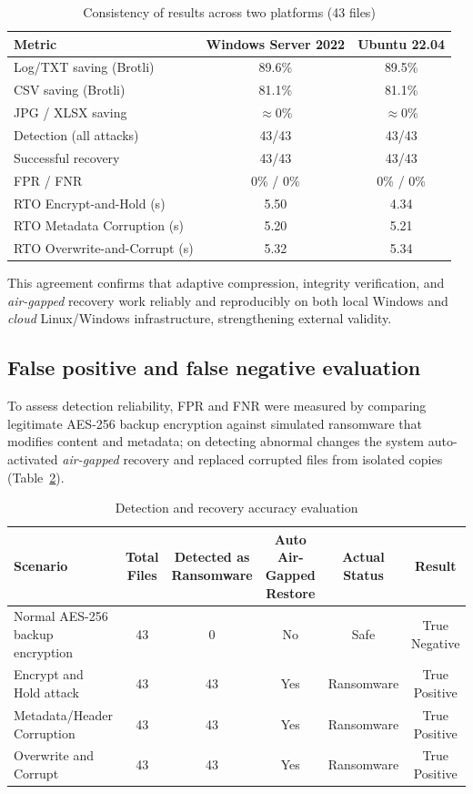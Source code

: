 \documentclass{iaesarticle}
\begin{document}
\begin{table}[H]
\centering
\fontsize{8pt}{10pt}\selectfont
\caption{Consistency of results across two platforms (43 files)}
\label{tab:cross_platform}
\begin{tabular}{l c c}
\hline
\textbf{Metric} & \textbf{Windows Server 2022} & \textbf{Ubuntu 22.04} \\
\hline
Log/TXT saving (Brotli) & 89.6\% & 89.5\% \\
CSV saving (Brotli)     & 81.1\% & 81.1\% \\
JPG / XLSX saving       & $\approx$0\% & $\approx$0\% \\
Detection (all attacks) & 43/43 & 43/43 \\
Successful recovery     & 43/43 & 43/43 \\
FPR / FNR               & 0\% / 0\% & 0\% / 0\% \\
RTO Encrypt-and-Hold (s) & 5.50 & 4.34 \\
RTO Metadata Corruption (s) & 5.20 & 5.21 \\
RTO Overwrite-and-Corrupt (s) & 5.32 & 5.34 \\
\hline
\end{tabular}
\end{table}

This agreement confirms that adaptive compression, integrity verification, and \textit{air-gapped} recovery work reliably and reproducibly on both local Windows and \textit{cloud} Linux/Windows infrastructure, strengthening external validity.

\subsection{False positive and false negative evaluation}
To assess detection reliability, FPR and FNR were measured by comparing legitimate AES-256 backup encryption against simulated ransomware that modifies content and metadata; on detecting abnormal changes the system auto-activated \textit{air-gapped} recovery and replaced corrupted files from isolated copies (Table~\ref{tab:detection_accuracy}).

\begin{table}[H]
\centering
\fontsize{8pt}{10pt}\selectfont
\caption{Detection and recovery accuracy evaluation}
\label{tab:detection_accuracy}
\begin{tabularx}{\textwidth}{@{}X c c c c c@{}}
\hline
\textbf{Scenario} & \textbf{Total Files} & \textbf{Detected as Ransomware} & \textbf{Auto Air-Gapped Restore} & \textbf{Actual Status} & \textbf{Result} \\
\hline
Normal AES-256 backup encryption & 43 & 0 & No & Safe & True Negative \\
Encrypt and Hold attack & 43 & 43 & Yes & Ransomware & True Positive \\
Metadata/Header Corruption & 43 & 43 & Yes & Ransomware & True Positive \\
Overwrite and Corrupt & 43 & 43 & Yes & Ransomware & True Positive \\
\hline
\end{tabularx}
\end{table}
\end{document}
